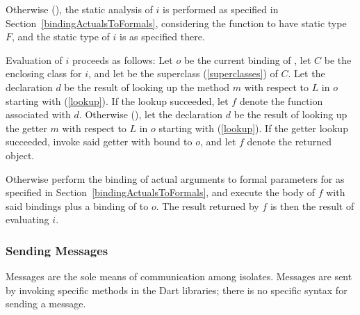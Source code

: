 \documentclass[makeidx]{article}
\begin{document}
{{\LMHash{}%
Otherwise (),
the static analysis of $i$ is performed as specified in Section~\ref{bindingActualsToFormals},
considering the function to have static type $F$,
and the static type of $i$ is as specified there.


\LMHash{}%
Evaluation of $i$ proceeds as follows:
Let $o$ be the current binding of \THIS{},
let $C$ be the enclosing class for $i$,
and let \SuperClass{} be the superclass (\ref{superclasses}) of $C$.
Let the declaration $d$ be the result of looking up
the method $m$ with respect to $L$ in $o$ starting with \SuperClass{}
(\ref{lookup}).
If the lookup succeeded,
let $f$ denote the function associated with $d$.
%
Otherwise (),
let the declaration $d$ be the result of looking up
the getter $m$ with respect to $L$ in $o$ starting with \SuperClass{}
(\ref{lookup}).
If the getter lookup succeeded,
invoke said getter with \THIS{} bound to $o$,
and let $f$ denote the returned object.


\LMHash{}%
Otherwise perform the binding of actual arguments to formal parameters for
as specified in Section~\ref{bindingActualsToFormals},
and execute the body of $f$ with said bindings
plus a binding of \THIS{} to $o$.
The result returned by $f$ is then the result of evaluating $i$.

} %


\subsubsection{Sending Messages}

\LMHash{}%
Messages are the sole means of communication among isolates.
Messages are sent by invoking specific methods in the Dart libraries; there is no specific syntax for sending a message.



}
\end{document}
